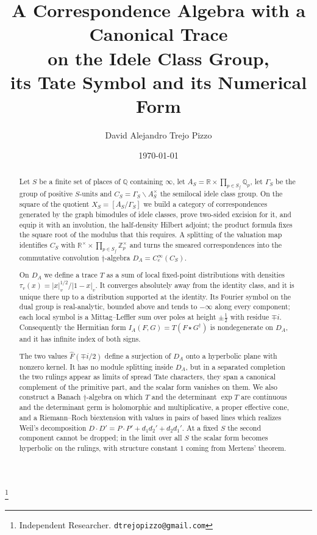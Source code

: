 \documentclass[11pt]{amsart}
\theoremstyle{definition}
\theoremstyle{remark}
\newcommand{\R}{\mathbb R}
\newcommand{\Z}{\mathbb Z}
\newcommand{\Q}{\mathbb Q}
\begin{document}
\title[A correspondence algebra on the idele class group]
{A Correspondence Algebra with a Canonical Trace\\
on the Idele Class Group,\\
its Tate Symbol and its Numerical Form}

\author{David Alejandro Trejo Pizzo}
\thanks{Independent Researcher. \texttt{dtrejopizzo@gmail.com}}

\date{\today}

\begin{abstract}
Let $S$ be a finite set of places of $\Q$ containing $\infty$, let
$A_S=\R\times\prod_{p\in S_f}\Q_p$, let $\Gamma_S$ be the group of positive
$S$-units and $C_S=\Gamma_S\backslash A_S^{\times}$ the semilocal idele class
group.  On the square of the quotient $X_S=[A_S/\Gamma_S]$ we build a category
of correspondences generated by the graph bimodules of idele classes, prove
two-sided excision for it, and equip it with an involution, the half-density
Hilbert adjoint; the product formula fixes the square root of the modulus
that this requires.  A splitting of the valuation map identifies $C_S$ with
$\R^{\times}\times\prod_{p\in S_f}\Z_p^{\times}$ and turns the smeared
correspondences into the commutative convolution $\dagger$-algebra
$D_A=C_c^{\infty}(C_S)$.

On $D_A$ we define a trace $T$ as a sum of local fixed-point distributions
with densities $\tau_v(x)=|x|_v^{1/2}/|1-x|_v$.  It converges absolutely away
from the identity class, and it is unique there up to a distribution
supported at the identity.  Its Fourier symbol on the dual group is
real-analytic, bounded above and tends to $-\infty$ along every component;
each local symbol is a Mittag--Leffler sum over poles at height $\pm\frac12$
with residue $\mp i$.  Consequently the Hermitian form
$I_A(F,G)=T(F\star G^{\dagger})$ is nondegenerate on $D_A$, and it has
infinite index of both signs.

The two values $\widehat F(\mp i/2)$ define a surjection of $D_A$ onto a
hyperbolic plane with nonzero kernel.  It has no module splitting inside
$D_A$, but in a separated completion the two rulings appear as limits of
spread Tate characters, they span a canonical complement of the primitive
part, and the scalar form vanishes on them.  We also construct a Banach
$\dagger$-algebra on which $T$ and the determinant $\exp T$ are continuous
and the determinant germ is holomorphic and multiplicative, a proper
effective cone, and a Riemann--Roch biextension with values in pairs of based
lines which realizes Weil's decomposition $D\cdot D'=P\cdot
P'+d_1d_2'+d_2d_1'$.  At a fixed $S$ the second component cannot be dropped;
in the limit over all $S$ the scalar form becomes hyperbolic on the rulings,
with structure constant $1$ coming from Mertens' theorem.
\end{abstract}
\end{document}
